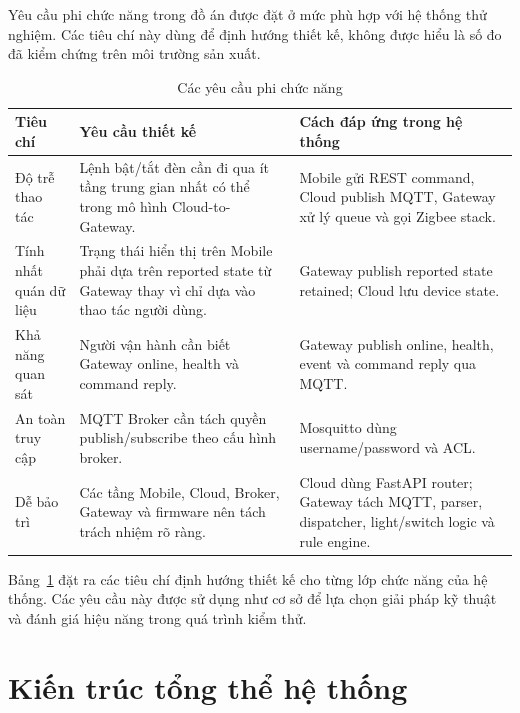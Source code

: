 Yêu cầu phi chức năng trong đồ án được đặt ở mức phù hợp với hệ thống thử nghiệm. Các tiêu chí này dùng để định hướng thiết kế, không được hiểu là số đo đã kiểm chứng trên môi trường sản xuất.

\begin{table}[H]
    \centering
    \caption{Các yêu cầu phi chức năng}
    \label{tab:ch3-nonfunc-req}
    \footnotesize
    \setlength{\tabcolsep}{3pt}
    \begin{tabular}{|>{\raggedright\arraybackslash}p{3.4cm}|>{\raggedright\arraybackslash}p{7.0cm}|>{\raggedright\arraybackslash}p{3.6cm}|}
        \hline
        \textbf{Tiêu chí} & \textbf{Yêu cầu thiết kế} & \textbf{Cách đáp ứng trong hệ thống} \\
        \hline
        Độ trễ thao tác & Lệnh bật/tắt đèn cần đi qua ít tầng trung gian nhất có thể trong mô hình Cloud-to-Gateway. & Mobile gửi REST command, Cloud publish MQTT, Gateway xử lý queue và gọi Zigbee stack. \\
        \hline
        Tính nhất quán dữ liệu & Trạng thái hiển thị trên Mobile phải dựa trên reported state từ Gateway thay vì chỉ dựa vào thao tác người dùng. & Gateway publish reported state retained; Cloud lưu device state. \\
        \hline
        Khả năng quan sát & Người vận hành cần biết Gateway online, health và command reply. & Gateway publish online, health, event và command reply qua MQTT. \\
        \hline
        An toàn truy cập & MQTT Broker cần tách quyền publish/subscribe theo cấu hình broker. & Mosquitto dùng username/password và ACL. \\
        \hline
        Dễ bảo trì & Các tầng Mobile, Cloud, Broker, Gateway và firmware nên tách trách nhiệm rõ ràng. & Cloud dùng FastAPI router; Gateway tách MQTT, parser, dispatcher, light/switch logic và rule engine. \\
        \hline
    \end{tabular}
    \setlength{\tabcolsep}{6pt}
\end{table}

Bảng~\ref{tab:ch3-nonfunc-req} đặt ra các tiêu chí định hướng thiết kế cho từng lớp chức năng của hệ thống. Các yêu cầu này được sử dụng như cơ sở để lựa chọn giải pháp kỹ thuật và đánh giá hiệu năng trong quá trình kiểm thử.

\section{Kiến trúc tổng thể hệ thống}
\label{sec:ch3-kientruc}

